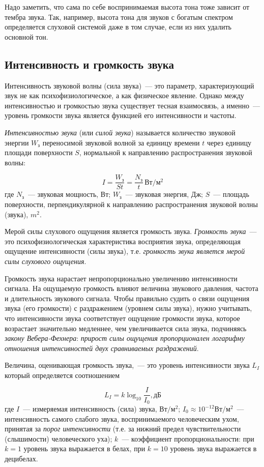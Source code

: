 \documentclass[oneside, final, 14pt]{extreport}
\begin{document}
Надо заметить, что сама по себе воспринимаемая высота тона тоже зависит от тембра звука. Так, например, высота тона для звуков с богатым спектром определяется слуховой системой даже в том случае, если из них удалить основной тон.

\subsection{Интенсивность и громкость звука}
Интенсивность звуковой волны (сила звука)~--- это параметр, характеризующий звук не как психофизиологическое, а как физическое явление. Однако между интенсивностью и громкостью звука существует тесная взаимосвязь, а именно~--- уровень громкости звука является функцией его интенсивности и частоты. 

{\itshape Интенсивностью звука} (или {\itshape силой звука}) называется количество звуковой энергии $W_\text{з}$ переносимой звуковой волной за единицу времени $t$ через единицу
площади поверхности $S$, нормальной к направлению распространения звуковой волны:

\[I=\frac{W_\text{з}}{St}=\frac{N_\text{з}}{t}\, \text{Вт}/\text{м}^2\]
где $N_\text{з}$~--- звуковая мощность, Вт; $W_\text{з}$~--- звуковая энергия, Дж; $S$~--- площадь поверхности, перпендикулярной к направлению распространения звуковой волны (звука), $m^2$.

Мерой силы слухового ощущения является громкость звука. {\itshape Громкость звука}~--- это психофизиологическая характеристика восприятия звука, определяющая ощущение интенсивности (силы звука), т.е. {\itshape громкость звука является мерой силы слухового ощущения}. 

Громкость звука нарастает непропорционально увеличению интенсивности сигнала. На ощущаемую громкость влияют величина звукового давления, частота и длительность звукового сигнала. Чтобы правильно судить о связи ощущения звука (его громкости) с раздражением (уровнем силы звука), нужно учитывать, что интенсивности звука соответствует ощущение громкости звука,
которое возрастает значительно медленнее, чем увеличивается сила звука, подчиняясь {\itshape закону Вебера-Фехнера}: {\itshape прирост силы ощущения пропорционален логарифму отношения интенсивностей двух сравниваемых раздражений}.

Величина, оценивающая громкость звука,~--- это уровень интенсивности звука $L_I$ который определяется соотношением

\[L_I=k \log_{10}{\frac{I}{I_0}}, \text{дБ}\]
где $I$~--- измеряемая интенсивность (сила) звука, $\text{Вт}/\text{м}^2$; $I_0\approx 10^{-12} \text{Вт}/\text{м}^2$~--- интенсивность самого слабого звука, воспринимаемого человеческим ухом, принятая за {\itshape порог интенсивности} (т.е. за нижний предел чувствительности (слышимости) человеческого уха); $k$~--- коэффициент пропорциональности: при $k=1$ уровень звука выражается в белах, при $k=10$ уровень звука выражается в децибелах.
\end{document}
